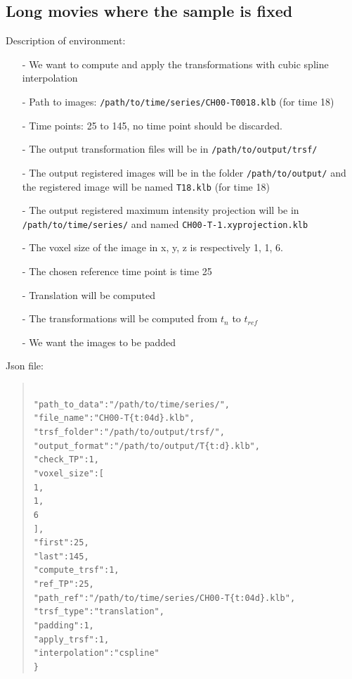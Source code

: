 \documentclass[10pt,a4paper]{article}
\newcommand\tab[1][.6cm]{\hspace*{#1}}
\newenvironment{code}[1]{\mbox{}\\[1ex]\hspace*{-#1cm}\begin{minipage}{150mm}\begin{quote}\tt}{\end{quote}\end{minipage}\mbox{}\\[1ex]}
\begin{document}
\subsection{Long movies where the sample is fixed}
Description of environment:
\begin{itemize}
\item[-] We want to compute and apply the transformations with cubic spline interpolation
\item[-] Path to images: \texttt{/path/to/time/series/CH00-T0018.klb} (for time 18)
\item[-] Time points: 25 to 145, no time point should be discarded.
\item[-] The output transformation files will be in \texttt{/path/to/output/trsf/}
\item[-] The output registered images will be in the folder \texttt{/path/to/output/} and the registered image will be named \texttt{T18.klb} (for time 18)
\item[-] The output registered maximum intensity projection will be in \texttt{/path/to/time/series/} and named \texttt{CH00-T-1.xyprojection.klb}
\item[-] The voxel size of the image in x, y, z is respectively 1, 1, 6.
\item[-] The chosen reference time point is time 25
\item[-] Translation will be computed
\item[-] The transformations will be computed from $t_n$ to $t_{ref}$
\item[-] We want the images to be padded
\end{itemize}
Json file:
\begin{code}{0.8}
\{\\
\tab"path\_to\_data":"/path/to/time/series/",\\
\tab"file\_name":"CH00-T\{t:04d\}.klb",\\
\tab"trsf\_folder":"/path/to/output/trsf/",\\
\tab"output\_format":"/path/to/output/T\{t:d\}.klb",\\
\tab"check\_TP":1,\\
\tab"voxel\_size":[\\
\tab\tab1,\\
\tab\tab1,\\
\tab\tab6\\
\tab],\\
\tab"first":25,\\
\tab"last":145,\\
\tab"compute\_trsf":1,\\
\tab"ref\_TP":25,\\
\tab"path\_ref":"/path/to/time/series/CH00-T\{t:04d\}.klb",\\
\tab"trsf\_type":"translation",\\
\tab"padding":1,\\
\tab"apply\_trsf":1,\\
\tab"interpolation":"cspline"\\
\}
\end{code}
\end{document}

